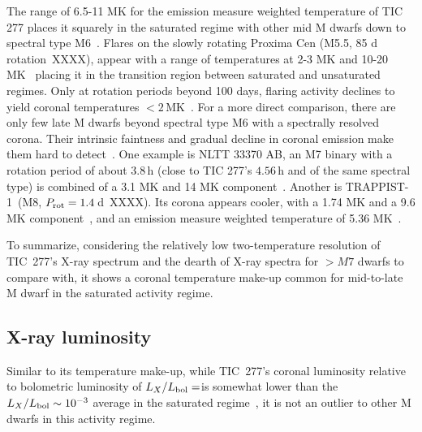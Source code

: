 \documentclass[twocolumn]{aastex631}
\begin{document}
The range of 6.5-11 MK for the emission measure weighted temperature of TIC 277 places it squarely in the saturated regime with other mid M dwarfs down to spectral type M6~\citep{wright2018stellar, magaudda2020relation, stelzer2022first,robrade2005xray,raassen2003xray,paudel2021simultaneous, foster2020corona}. Flares on the slowly rotating Proxima Cen (M5.5, 85 d rotation~XXXX), appear with a range of temperatures at 2-3 MK and 10-20 MK~\citep{gudel2004flares, fuhrmeister2011multiwavelength, fuhrmeister2022high, howard2022mouse} placing it in the transition region between saturated and unsaturated regimes. Only at rotation periods beyond 100 days, flaring activity declines to yield coronal temperatures $<2\,$MK~\citep{wright2018stellar, foster2020corona}. For a more direct comparison, there are only few late M dwarfs beyond spectral type M6 with a spectrally resolved corona. Their intrinsic faintness and gradual decline in coronal emission make them hard to detect~\citep{berger2010, cook2014trends, stelzer2022first}. One example is NLTT 33370 AB, an M7 binary with a rotation period of about $3.8\,$h (close to TIC 277's $4.56\,$h and of the same spectral type) is combined of a 3.1 MK and 14 MK component~\citep{williams2015simultaneous}. Another is TRAPPIST-1~(M8, $P_{\rm rot} = 1.4\,$d~XXXX). Its corona appears cooler, with a 1.74 MK and a 9.6 MK component~\citep{wheatley2017strong}, and an emission measure weighted temperature of 5.36 MK~\citep{brown2023coronal}. 

To summarize, considering the relatively low two-temperature resolution of TIC~277's X-ray spectrum and the dearth of X-ray spectra for $>M7$ dwarfs to compare with, it shows a coronal temperature make-up common for mid-to-late M dwarf in the saturated activity regime. 






\subsection{X-ray luminosity}
\label{sec:discussion:xraylum}
Similar to its temperature make-up, while TIC~277's coronal luminosity relative to bolometric luminosity of $L_X/L_{\rm bol}=$\LXLbol is somewhat lower than the $L_X/L_{\rm bol}\sim 10^{-3}$ average in the saturated regime~\citep{wright2018stellar}, it is not an outlier to other M dwarfs in this activity regime.  
\end{document}

